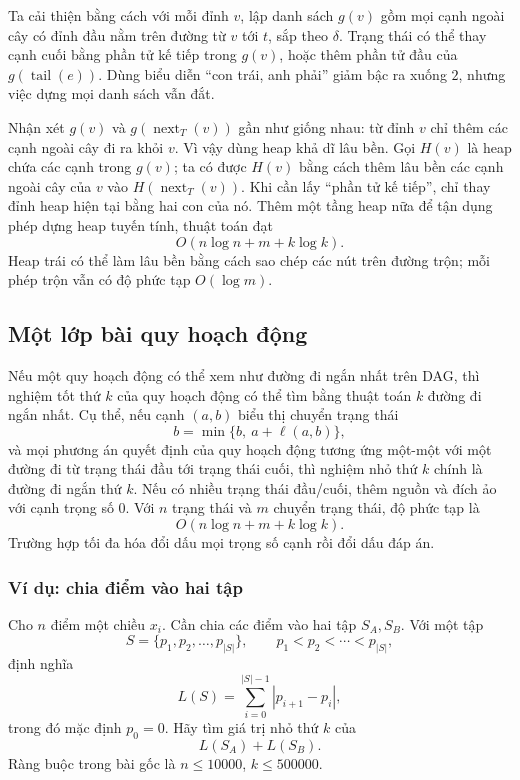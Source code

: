 \documentclass[11pt]{article}
\begin{document}
Ta cải thiện bằng cách với mỗi đỉnh \(v\), lập danh sách \(g(v)\) gồm mọi cạnh
ngoài cây có đỉnh đầu nằm trên đường từ \(v\) tới \(t\), sắp theo \(\delta\).
Trạng thái có thể thay cạnh cuối bằng phần tử kế tiếp trong \(g(v)\), hoặc thêm
phần tử đầu của \(g(\operatorname{tail}(e))\). Dùng biểu diễn ``con trái, anh
phải'' giảm bậc ra xuống \(2\), nhưng việc dựng mọi danh sách vẫn đắt.

Nhận xét \(g(v)\) và \(g(\operatorname{next}_T(v))\) gần như giống nhau: từ
đỉnh \(v\) chỉ thêm các cạnh ngoài cây đi ra khỏi \(v\). Vì vậy dùng heap khả
dĩ lâu bền. Gọi \(H(v)\) là heap chứa các cạnh trong \(g(v)\); ta có được
\(H(v)\) bằng cách thêm lâu bền các cạnh ngoài cây của \(v\) vào
\(H(\operatorname{next}_T(v))\). Khi cần lấy ``phần tử kế tiếp'', chỉ thay đỉnh
heap hiện tại bằng hai con của nó. Thêm một tầng heap nữa để tận dụng phép dựng
heap tuyến tính, thuật toán đạt
\[
  O(n\log n+m+k\log k).
\]
Heap trái có thể làm lâu bền bằng cách sao chép các nút trên đường trộn; mỗi
phép trộn vẫn có độ phức tạp \(O(\log m)\).

\subsection{Một lớp bài quy hoạch động}

Nếu một quy hoạch động có thể xem như đường đi ngắn nhất trên DAG, thì nghiệm
tốt thứ \(k\) của quy hoạch động có thể tìm bằng thuật toán \(k\) đường đi ngắn
nhất. Cụ thể, nếu cạnh \((a,b)\) biểu thị chuyển trạng thái
\[
  b=\min\{b,\ a+\ell(a,b)\},
\]
và mọi phương án quyết định của quy hoạch động tương ứng một-một với một đường
đi từ trạng thái đầu tới trạng thái cuối, thì nghiệm nhỏ thứ \(k\) chính là
đường đi ngắn thứ \(k\). Nếu có nhiều trạng thái đầu/cuối, thêm nguồn và đích
ảo với cạnh trọng số \(0\). Với \(n\) trạng thái và \(m\) chuyển trạng thái, độ
phức tạp là
\[
  O(n\log n+m+k\log k).
\]
Trường hợp tối đa hóa đổi dấu mọi trọng số cạnh rồi đổi dấu đáp án.

\subsubsection{Ví dụ: chia điểm vào hai tập}

Cho \(n\) điểm một chiều \(x_i\). Cần chia các điểm vào hai tập \(S_A,S_B\).
Với một tập
\[
  S=\{p_1,p_2,\ldots,p_{|S|}\},\qquad p_1<p_2<\cdots<p_{|S|},
\]
định nghĩa
\[
  L(S)=\sum_{i=0}^{|S|-1}|p_{i+1}-p_i|,
\]
trong đó mặc định \(p_0=0\). Hãy tìm giá trị nhỏ thứ \(k\) của
\[
  L(S_A)+L(S_B).
\]
Ràng buộc trong bài gốc là \(n\le 10000\), \(k\le 500000\).
\end{document}
